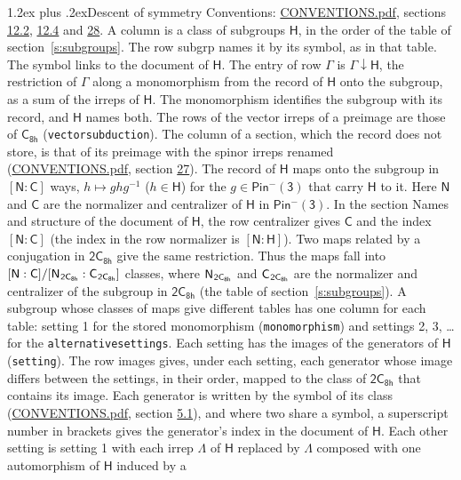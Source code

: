 \documentclass[10pt,a4paper]{article}
\makeatletter
\renewcommand\section{\@startsection{section}{1}{\z@}{-3ex plus -1ex minus -.2ex}%
  {1.2ex plus .2ex}{\normalfont\large\sffamily\bfseries\color{parttitle}}}
\numberwithin{equation}{section}
\newcommand{\grp}[1]{\mathsf{#1}}
\newcommand{\grpindex}[2]{[#1 : #2]}
\newcommand{\restr}[2]{#1\!\downarrow#2}
\newcommand{\hairsp}{\mkern1mu}
\makeatother
\begin{document}
\section{Descent of symmetry}\label{s:subduction}
Conventions: \href{../../CONVENTIONS.pdf}{CONVENTIONS.pdf}, sections \href{../../../rotation/CONVENTIONS.pdf\#conv.12.2}{12.2}, \href{../../../rotation/CONVENTIONS.pdf\#conv.12.4}{12.4} and \href{../../CONVENTIONS.pdf\#conv.28}{28}.
A column is a class of subgroups $\grp{H}$, in the order of the table of section~\ref{s:subgroups}. The row subgrp names it by its symbol, as in that table. The symbol links to the document of $\grp{H}$. The entry of row $\Gamma$ is $\restr{\Gamma}{\grp{H}}$, the restriction of $\Gamma$ along a monomorphism from the record of $\grp{H}$ onto the subgroup, as a sum of the irreps of $\grp{H}$. The monomorphism identifies the subgroup with its record, and $\grp{H}$ names both. The rows of the vector irreps of a preimage are those of \href{../../../rotation/data/pdf/C8h.pdf}{$\grp{C_{8h}}$} (\texttt{vectorsubduction}). The column of a section, which the record does not store, is that of its preimage with the spinor irreps renamed (\href{../../CONVENTIONS.pdf}{CONVENTIONS.pdf}, section \href{../../CONVENTIONS.pdf\#conv.27}{27}). \label{n:group.normalizer.o3}\label{n:group.centralizer.o3}\label{n:element.h}The record of $\grp{H}$ maps onto the subgroup in $\grpindex{\grp{N}}{\grp{C}}$ ways, $h \mapsto g h g^{-1}$ ($h \in \grp{H}$) for the $g \in \grp{Pin^{-}(3)}$ that carry $\grp{H}$ to it. Here $\grp{N}$ and $\grp{C}$ are the normalizer and centralizer of $\grp{H}$ in \href{Pinminus3.pdf}{$\grp{Pin^{-}(3)}$}. In the section Names and structure of the document of $\grp{H}$, the row centralizer gives $\grp{C}$ and the index $\grpindex{\grp{N}}{\grp{C}}$ (the index in the row normalizer is $\grpindex{\grp{N}}{\grp{H}}$). Two maps related by a conjugation in $\grp{2C_{8h}}$ give the same restriction. Thus the maps fall into $\grpindex{\grp{N}}{\grp{C}}/\grpindex{\grp{N}_{\hairsp \grp{2C_{8h}}}}{\grp{C}_{\hairsp \grp{2C_{8h}}}}$ classes, where $\grp{N}_{\hairsp \grp{2C_{8h}}}$ and $\grp{C}_{\hairsp \grp{2C_{8h}}}$ are the normalizer and centralizer of the subgroup in $\grp{2C_{8h}}$ (the table of section~\ref{s:subgroups}). \label{n:head.setting}A subgroup whose classes of maps give different tables has one column for each table: setting 1 for the stored monomorphism (\texttt{monomorphism}) and settings 2, 3, \dots{} for the \texttt{alternativesettings}. Each setting has the images of the generators of $\grp{H}$ (\texttt{setting}). \label{n:head.images}The row images gives, under each setting, each generator whose image differs between the settings, in their order, mapped to the class of $\grp{2C_{8h}}$ that contains its image. Each generator is written by the symbol of its class (\href{../../CONVENTIONS.pdf}{CONVENTIONS.pdf}, section \href{../../../rotation/CONVENTIONS.pdf\#conv.5.1}{5.1}), and where two share a symbol, a superscript number in brackets gives the generator's index in the document of $\grp{H}$. \label{n:irrep.Delta}Each other setting is setting 1 with each irrep $\Lambda$ of $\grp{H}$ replaced by $\Lambda$ composed with one automorphism of $\grp{H}$ induced by a 
\end{document}
